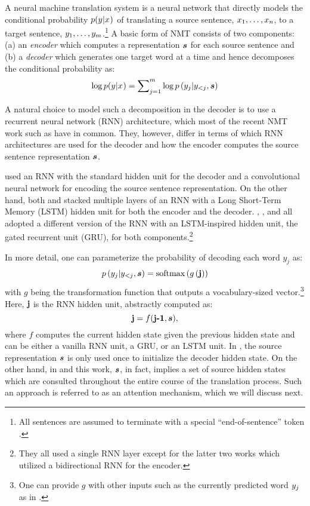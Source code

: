 A neural machine translation system is a neural network that directly models the conditional probability $p(y_{}|x_{})$ of translating
a source sentence, $x_{1},\ldots,x_{n}$, to a target sentence, $y_{1},\ldots,y_{m}$.\footnote{All sentences are assumed to terminate with a special ``end-of-sentence'' token \eos{}.}
A basic form of NMT consists of two components: (a) an {\it encoder} which computes a representation $\mbox{\boldmath{$s$}}$ for each source sentence  and (b) a {\it decoder} which generates one target word at a time and hence decomposes the conditional probability as:
\begin{equation}
\log p(y_{}|x_{}) = \sum_{j=1}^m \nolimits \log p\left(y_{j}|y_{<j},\mbox{\boldmath{$s$}}\right)
\end{equation}

A natural choice to model such a decomposition in the decoder is to use a recurrent neural network (RNN) architecture, which most of the recent NMT work such as \cite{kal13,sutskever14,cho14,bog15,luong15,jean15} have in common. They, however, differ in terms of which RNN architectures are used for the decoder and how the encoder computes the source sentence representation $\mbox{\boldmath{$s$}}$.

 used an RNN with the standard hidden unit for the decoder and a
convolutional neural network for encoding the source sentence representation. On
the other hand, both  and  stacked
multiple layers of an RNN with a Long Short-Term Memory (LSTM) hidden unit for
both the encoder and the decoder. , , and
 all adopted a different version of the RNN with an
LSTM-inspired hidden unit, the gated recurrent unit (GRU), for both
components.\footnote{They all used a single RNN layer except for the latter two
works which utilized a bidirectional RNN for the encoder.}

In more detail, one can parameterize the probability of decoding each word $y_j$ as:
\begin{equation}
p\left(y_{j}|y_{<j},\mbox{\boldmath{$s$}}\right) = \operatorname{softmax}\left(g\left(\textbf{j}\right)\right)
\end{equation}
with $g$ being the transformation function that outputs a vocabulary-sized
vector.\footnote{One can provide $g$ with other inputs such as the currently
predicted word $y_{j}$ as in \cite{bog15}.} Here, $\textbf{j}$ is the RNN hidden
unit, abstractly computed as:
\begin{equation}
\textbf{j} = f(\textbf{j-1}, \mbox{\boldmath{$s$}}),
\end{equation}
where $f$ computes the current hidden state given the previous hidden state and
can be either a vanilla RNN unit, a GRU, or an LSTM unit. In \cite{kal13,sutskever14,cho14,luong15}, the source representation $\mbox{\boldmath{$s$}}$ is only used once to initialize the decoder hidden state. On the other hand, in \cite{bog15,jean15} and this work, $\mbox{\boldmath{$s$}}$, in fact, implies a set of source hidden states which are consulted throughout the entire course of the translation process. Such an approach is referred to as an attention mechanism, which we will discuss next.

